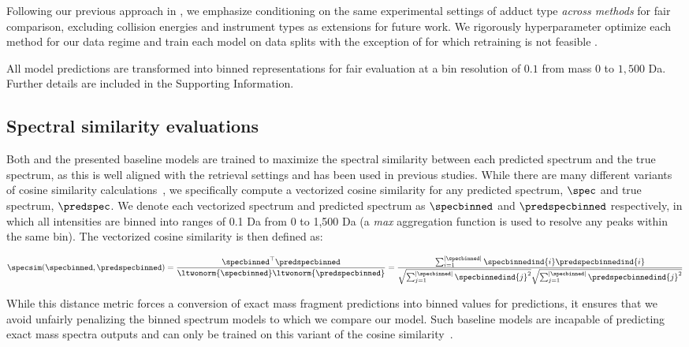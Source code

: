 \documentclass[journal=jcim,manuscript=article]{achemso}
\begin{document}
Following our previous approach in \cite{goldman_prefix-tree_2023}, we emphasize conditioning on the same experimental settings of adduct type \emph{across methods} for fair comparison, excluding collision energies and instrument types as extensions for future work. We rigorously hyperparameter optimize each method for our data regime and train each model on data splits with the exception of \cfmModel for which retraining is not feasible \cite{goldman_prefix-tree_2023, young_Massformer_2021, murphy2023efficiently}.

All model predictions are transformed into binned representations for fair evaluation at a bin resolution of $0.1$ from mass $0$ to $1,500$ Da. Further details are included in the Supporting Information. %

\subsection{Spectral similarity evaluations}

Both \ourModel and the presented baseline models are trained to maximize the spectral similarity between each predicted spectrum and the true spectrum, as this is well aligned with the retrieval settings and has been used in previous studies. While there are many different variants of cosine similarity calculations~\cite{demuth2004spectral,huber_spec2vec_2021, li2021spectral}, we specifically compute a vectorized cosine similarity for any predicted spectrum, $\spec$ and true spectrum, $\predspec$. We denote each vectorized spectrum and predicted spectrum as $\specbinned$ and $\predspecbinned$ respectively, in which all intensities are binned into ranges of 0.1 Da from 0 to 1,500 Da (a \emph{max} aggregation function is used to resolve any peaks within the same bin). The vectorized cosine similarity is then defined as:

\begin{equation}
    \specsim(\specbinned, \predspecbinned) = \frac{\specbinned^\top\predspecbinned}{\ltwonorm{\specbinned} \ltwonorm{\predspecbinned}} = \frac{\sum_{i=1}^{|\specbinned|} \specbinnedind{i} \predspecbinnedind{i}}{\sqrt{\sum_{j=1}^{|\specbinned|} \specbinnedind{j}^2} \sqrt{\sum_{j=1}^{|\specbinned|} \predspecbinnedind{j}^2}}
\end{equation}


While this distance metric forces a conversion of exact mass fragment predictions into binned values for \ourModel predictions, it ensures that we avoid unfairly penalizing the binned spectrum models to which we compare our model. Such baseline models are incapable of predicting exact mass spectra outputs and can only be trained on this variant of the cosine similarity~\cite{wei_rapid_2019,
zhu_using_2020, young_Massformer_2021, hong20233DMolMS}.
\end{document}
